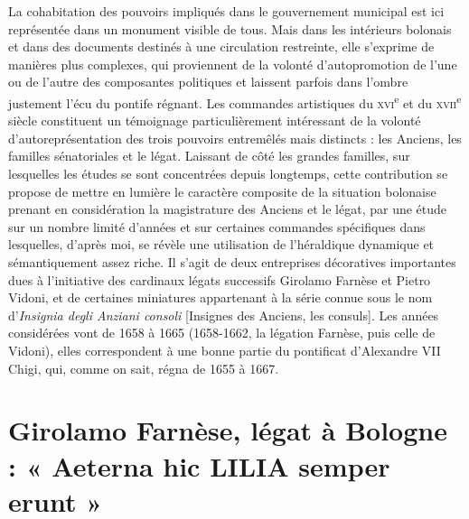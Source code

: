 \documentclass[12pt,twoside,openany]{book}
\begin{document}
La cohabitation des pouvoirs impliqués dans le gouvernement municipal est ici représentée dans un monument visible de tous. Mais dans les intérieurs bolonais et dans des documents destinés à une circulation restreinte, elle s’exprime de manières plus complexes, qui proviennent de la volonté d’autopromotion de l’une ou de l’autre des composantes politiques et laissent parfois dans l’ombre justement l’écu du pontife régnant. Les commandes artistiques du \textsc{xvi}\textsuperscript{e} et du \textsc{xvii}\textsuperscript{e} siècle constituent un témoignage particulièrement intéressant de la volonté d’autoreprésentation des trois pouvoirs entremêlés mais distincts : les Anciens, les familles sénatoriales et le légat. Laissant de côté les grandes familles, sur lesquelles les études se sont concentrées depuis longtemps, cette contribution se propose de mettre en lumière le caractère composite de la situation bolonaise prenant en considération la magistrature des Anciens et le légat, par une étude sur un nombre limité d’années et sur certaines commandes spécifiques dans lesquelles, d’après moi, se révèle une utilisation de l’héraldique dynamique et sémantiquement assez riche. Il s’agit de deux entreprises décoratives importantes dues à l’initiative des cardinaux légats successifs Girolamo Farnèse et Pietro Vidoni, et de certaines miniatures appartenant à la série connue sous le nom d’\textit{Insignia degli Anziani consoli} [Insignes des Anciens, les consuls]. Les années considérées vont de 1658 à 1665 (1658-1662, la légation Farnèse, puis celle de Vidoni), elles correspondent à une bonne partie du pontificat d’Alexandre VII Chigi, qui, comme on sait, régna de 1655 à 1667.

\section{Girolamo Farnèse, légat à Bologne : « Aeterna hic LILIA semper erunt »}
\end{document}
